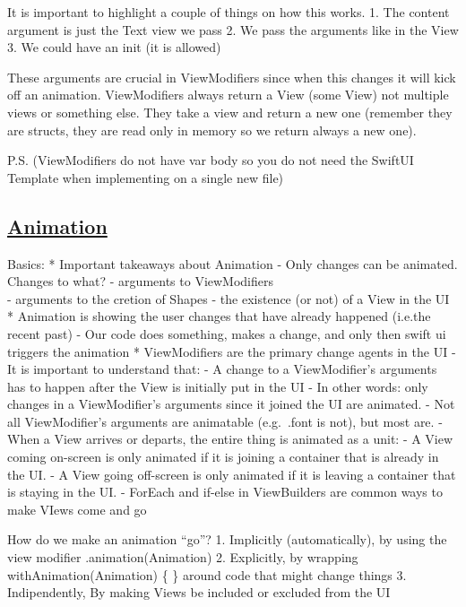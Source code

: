 \documentclass[]{article}
\begin{document}
It is important to highlight a couple of things on how this works. 1.
The content argument is just the Text view we pass 2. We pass the
arguments like in the View 3. We could have an init (it is allowed)

These arguments are crucial in ViewModifiers since when this changes it
will kick off an animation. ViewModifiers always return a View (some
View) not multiple views or something else. They take a view and return
a new one (remember they are structs, they are read only in memory so we
return always a new one).

P.S. (ViewModifiers do not have var body so you do not need the SwiftUI
Template when implementing on a single new file)

\hypertarget{animation-1}{%
\subsection{\texorpdfstring{\href{https://www.youtube.com/watch?v=PoeaUMGAx6c}{Animation}}{Animation}}\label{animation-1}}

Basics: * Important takeaways about Animation - Only changes can be
animated. Changes to what? - arguments to ViewModifiers\\
- arguments to the cretion of Shapes - the existence (or not) of a View
in the UI * Animation is showing the user changes that have already
happened (i.e.the recent past) - Our code does something, makes a
change, and only then swift ui triggers the animation * ViewModifiers
are the primary change agents in the UI - It is important to understand
that: - A change to a ViewModifier's arguments has to happen after the
View is initially put in the UI - In other words: only changes in a
ViewModifier's arguments since it joined the UI are animated. - Not all
ViewModifier's arguments are animatable (e.g.~.font is not), but most
are. - When a View arrives or departs, the entire thing is animated as a
unit: - A View coming on-screen is only animated if it is joining a
container that is already in the UI. - A View going off-screen is only
animated if it is leaving a container that is staying in the UI. -
ForEach and if-else in ViewBuilders are common ways to make VIews come
and go

How do we make an animation ``go''? 1. Implicitly (automatically), by
using the view modifier .animation(Animation) 2. Explicitly, by wrapping
withAnimation(Animation) \{ \} around code that might change things 3.
Indipendently, By making Views be included or excluded from the UI
\end{document}
